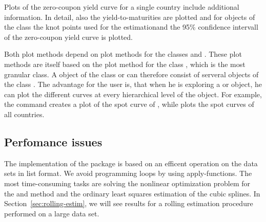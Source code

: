 Plots of the zero-coupon yield curve for a single country include additional information. In detail, 
also the yield-to-maturities are plotted and for objects of the class  the knot points used for the estimationand the 95\% confidence intervall of the zero-coupon yield curve is plotted. 

Both plot methods depend on plot methods for the classes  and . These plot methods are itself based on the plot method for the class , which is the most granular class.
A object of the class  or  can therefore consist of serveral 
objects of the class . The advantage for the user is, that when he
is exploring a  or  object, he can plot the different curves at every hierarchical level of the object. For example, the command  creates a plot of the spot curve of , while  plots the spot curves of all countries. 


\subsection{Perfomance issues}
\label{sec:perfomance-issues}

The implementation of the  package is based on an efficent operation on the data sets in list format. We avoid programming loops by using apply-functions. The most time-consuming tasks are solving the nonlinear optimization problem for the \cite{Nelson1987} and \cite{Svensson1994} method and the ordinary least squares estimation of the \cite{McCulloch1975} cubic splines. In Section~\ref{sec:rolling-estim}, we will see results for a rolling estimation procedure performed on a large data set.


